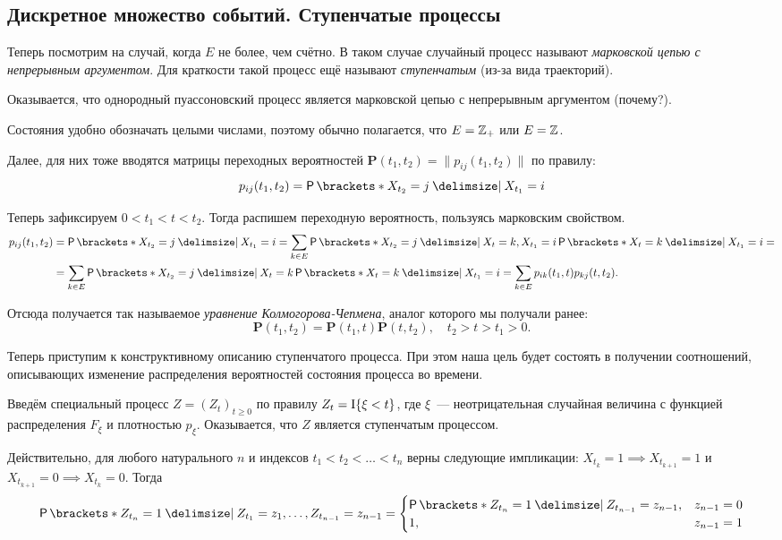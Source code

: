 \subsection{Дискретное множество событий. Ступенчатые процессы}
Теперь посмотрим на случай, когда \(E\) не более, чем счётно. В таком случае 
случайный процесс называют \emph{марковской цепью с непрерывным аргументом}. 
Для краткости такой процесс ещё называют \emph{ступенчатым} (из-за вида 
траекторий).
\begin{example}
	Оказывается, что однородный пуассоновский процесс является марковской цепью 
	с непрерывным аргументом (почему?).
\end{example}

Состояния удобно обозначать целыми числами, поэтому обычно полагается, что \(E 
= \mathbb{Z}_{+}\) или \(E = \mathbb{Z}\). 

Далее, для них тоже вводятся матрицы переходных вероятностей 
\(\mathbf{P}(t_{1}, t_{2}) = \|p_{ij}(t_{1}, t_{2})\|\) по правилу:
\[
	p_{ij}(t_{1}, t_{2}) = \Pr{X_{t_{2}} = j \given X_{t_{1}} = i}
\]

Теперь зафиксируем \(0 < t_{1} < t < t_{2}\). Тогда распишем переходную 
вероятность, пользуясь марковским свойством.
\begin{align*}
	p_{ij}(t_{1}, t_{2}) &= \Pr{X_{t_{2}} = j \given X_{t_{1}} = i} = \sum_{k 
	\in E} \Pr{X_{t_{2}} = j \given X_{t} = k, X_{t_{1}} = i}\Pr{X_{t} = k 
	\given X_{t_{1}} = i} = \\
	&= \sum_{k \in E} \Pr{X_{t_{2}} = j \given X_{t} = k}\Pr{X_{t} = k \given 
	X_{t_{1}} = i} = \sum_{k 
	\in E} p_{ik}(t_{1}, t)p_{kj}(t, t_{2}).
\end{align*}

Отсюда получается так называемое \emph{уравнение Колмогорова-Чепмена}, аналог 
которого мы получали ранее:
\[
	\textbf{P}(t_{1}, t_{2}) = \textbf{P}(t_{1}, t)\textbf{P}(t, t_{2}), \quad 
	t_{2} > t > t_{1} > 0.
\]

Теперь приступим к конструктивному описанию ступенчатого процесса. При этом 
наша цель будет состоять в получении соотношений, описывающих изменение 
распределения вероятностей состояния процесса во времени.

Введём специальный процесс \(Z = (Z_{t})_{t \geq 0}\) по правилу \(Z_{t} = 
\operatorname{\mathrm{I}}\{\xi < t\}\), где \(\xi\)~--- неотрицательная случайная величина с функцией 
распределения \(F_{\xi}\) и плотностью \(p_{\xi}\). Оказывается, что \(Z\) 
является ступенчатым процессом.

Действительно, для любого натурального \(n\) и индексов \(t_{1} < t_{2} < 
\ldots < t_{n}\) верны следующие импликации: \(X_{t_{k}} = 1 \implies X_{t_{k + 
1}} = 1\) и \(X_{t_{k + 1}} = 0 \implies X_{t_{k}} = 0\). Тогда
\[
	\Pr{Z_{t_{n}} = 1 \given Z_{t_{1}} = z_{1}, \ldots, Z_{t_{n - 1}} = z_{n - 
	1}} = 
	\begin{cases}
	\Pr{Z_{t_{n}} = 1 \given Z_{t_{n - 1}} = z_{n - 1}}, & z_{n - 1} = 0 \\
	1, & z_{n - 1} = 1
	\end{cases}
\]


